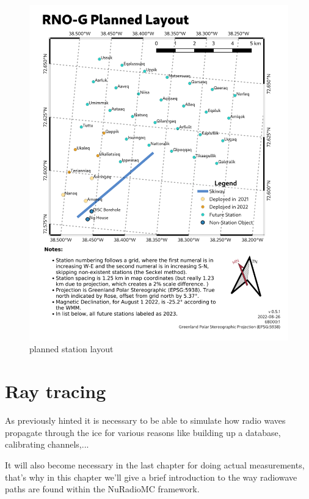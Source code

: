 \documentclass[11pt,a4paper,faculty=we,language=en,doctype=report]{cls/ugent-doc}
\begin{document}
\begin{figure}
	\includegraphics[width=\textwidth]{figures/station-map.png}	
	\caption{planned station layout}
	\label{fig:station map}
\end{figure}

\chapter{Ray tracing}
As previously hinted it is necessary to be able to simulate how radio waves
propagate through the ice for various reasons like building up a database, calibrating channels,...

It will also become necessary in the last chapter for doing actual measurements,
that's why in this chapter we'll give a brief introduction to the way radiowave
paths are found within the NuRadioMC framework.
\end{document}
